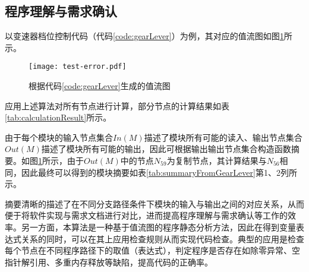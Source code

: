 \subsection{程序理解与需求确认}
以变速器档位控制代码（代码\ref{code:gearLever}）为例，其对应的值流图如图\ref{fig:test-error}所示。

\begin{figure}[H]
	\centering
	\texttt{[image: test-error.pdf]}
	\caption{根据代码\ref{code:gearLever}生成的值流图}
	\label{fig:test-error}
\end{figure}

应用上述算法对所有节点进行计算，部分节点的计算结果如表\ref{tab:calculationResult}所示。

由于每个模块的输入节点集合$ In(M) $描述了模块所有可能的读入、输出节点集合$ Out(M) $描述了模块所有可能的输出，因此可根据输出输出节点集合构造函数摘要。如图\ref{fig:test-error}所示，由于$ Out(M) $中的节点$ N_{59} $为复制节点，其计算结果与$ N_{56} $相同，因此最终可以得到的模块摘要如表\ref{tab:summaryFromGearLever}第1、2列所示。

摘要清晰的描述了在不同分支路径条件下模块的输入与输出之间的对应关系，从而便于将软件实现与需求文档进行对比，进而提高程序理解与需求确认等工作的效率。另一方面，本算法是一种基于值流图的程序静态分析方法，因此在得到变量表达式关系的同时，可以在其上应用检查规则从而实现代码检查。典型的应用是检查每个节点在不同程序路径下的取值（表达式），判定程序是否存在如除零异常、空指针解引用、多重内存释放等缺陷，提高代码的正确率。

